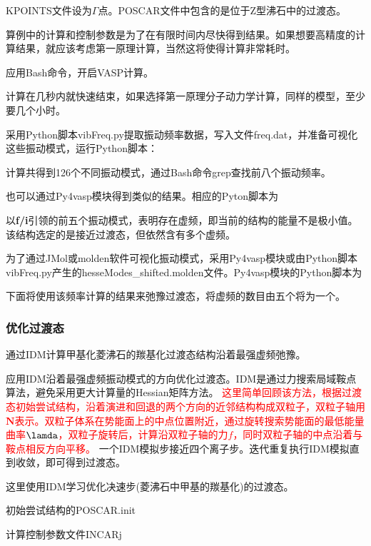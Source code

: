 \textrm{KPOINTS}文件设为$\Gamma$点。\textrm{POSCAR}文件中包含的是位于\textrm{Z}型沸石中的过渡态。

算例中的计算和控制参数是为了在有限时间内尽快得到结果。如果想要高精度的计算结果，就应该考虑第一原理计算，当然这将使得计算非常耗时。

应用\textrm{Bash}命令，开启\textrm{VASP}计算。

计算在几秒内就快速结束，如果选择第一原理分子动力学计算，同样的模型，至少要几个小时。

采用\textrm{Python}脚本\textrm{vibFreq.py}提取振动频率数据，写入文件\textrm{freq.dat}，并准备可视化这些振动模式，运行\textrm{Python}脚本：

计算共得到126个不同振动模式，通过\textrm{Bash}命令\textrm{grep}查找前八个振动频率。

也可以通过\textrm{Py4vasp}模块得到类似的结果。相应的\textrm{Pyton}脚本为

以\textbf{f/i}引领的前五个振动模式，表明存在虚频，即当前的结构的能量不是极小值。该结构选定的是接近过渡态，但依然含有多个虚频。

为了通过\textrm{JMol}或\textrm{molden}软件可视化振动模式，采用\textrm{Py4vasp}模块或由\textrm{Python}脚本\textrm{vibFreq.py}产生的\textrm{hesseModes\_shifted.molden}文件。\textrm{Py4vasp}模块的\textrm{Python}脚本为

下面将使用该频率计算的结果来弛豫过渡态，将虚频的数目由五个将为一个。

\subsubsection{优化过渡态}
通过\textrm{IDM}计算甲基化菱沸石的羰基化过渡态结构沿着最强虚频弛豫。

应用\textrm{IDM}沿着最强虚频振动模式的方向优化过渡态。\textrm{IDM}是通过力搜索局域鞍点算法，避免采用更大计算量的\textrm{Hessian}矩阵方法。
\textcolor{red}{这里简单回顾该方法，根据过渡态初始尝试结构，沿着演进和回退的两个方向的近邻结构构成双粒子，双粒子轴用$\mathbf{N}$表示。双粒子体系在势能面上的中点位置附近，通过旋转搜索势能面的最低能量曲率$\lamda$，双粒子旋转后，计算沿双粒子轴的力$f$，同时双粒子轴的中点沿着与鞍点相反方向平移。}
一个\textrm{IDM}模拟步接近四个离子步。迭代重复执行\textrm{IDM}模拟直到收敛，即可得到过渡态。

这里使用\textrm{IDM}学习优化决速步(菱沸石中甲基的羰基化)的过渡态。

初始尝试结构的\textrm{POSCAR.init}

计算控制参数文件\textrm{INCARj}

